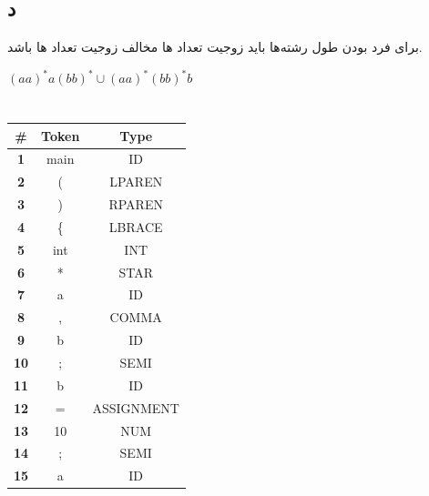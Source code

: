 \documentclass{article}
\begin{document}
\subsection{د}
برای فرد بودن طول رشته‌ها باید زوجیت تعداد ها مخالف زوجیت تعداد ها باشد.
\begin{latin}
$
\left( aa \right) ^ * a \left( bb \right) ^ * \cup \left( aa \right) ^ * \left( bb \right) ^ * b
$
\end{latin}


\section{}%
\subsection{}
\begin{latin}
\begin{longtable}[c]{|c|c|c|}
\hline
\textbf{\#} & \textbf{Token}          & \textbf{Type} \\ \hline
\textbf{1}  & main                    & ID            \\ \hline
\textbf{2}  & (                       & LPAREN        \\ \hline
\textbf{3}  & )                       & RPAREN        \\ \hline
\textbf{4}  & \{  					& LBRACE        \\ \hline
\textbf{5}  & int                     & INT           \\ \hline
\textbf{6}  & *                       & STAR          \\ \hline
\textbf{7}  & a                       & ID            \\ \hline
\textbf{8}  & ,                       & COMMA         \\ \hline
\textbf{9}  & b                       & ID            \\ \hline
\textbf{10} & ;                       & SEMI          \\ \hline
\textbf{11} & b                       & ID            \\ \hline
\textbf{12} & =                       & ASSIGNMENT    \\ \hline
\textbf{13} & 10                      & NUM           \\ \hline
\textbf{14} & ;                       & SEMI          \\ \hline
\textbf{15} & a                       & ID            \\ \hline

\end{longtable}
\end{latin}
\end{document}
